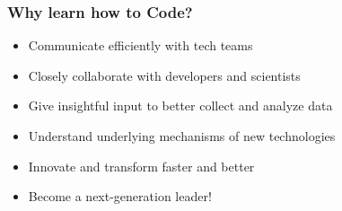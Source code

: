 \begin{frame}
\frametitle{Why learn how to Code?}
\vskip 0.8cm
\begin{itemize}
    \item \textcolor{isvblue}{Communicate efficiently} with tech teams
    \item \textcolor{isvblue}{Closely collaborate} with developers and scientists
    \item \textcolor{isvblue}{Give insightful input} to better collect and analyze data
    \item \textcolor{isvblue}{Understand} underlying mechanisms of new technologies
    \item \textcolor{isvblue}{Innovate and transform} faster and better
    \item \textcolor{isvblue}{Become a next-generation leader!}
\end{itemize}
\end{frame}


